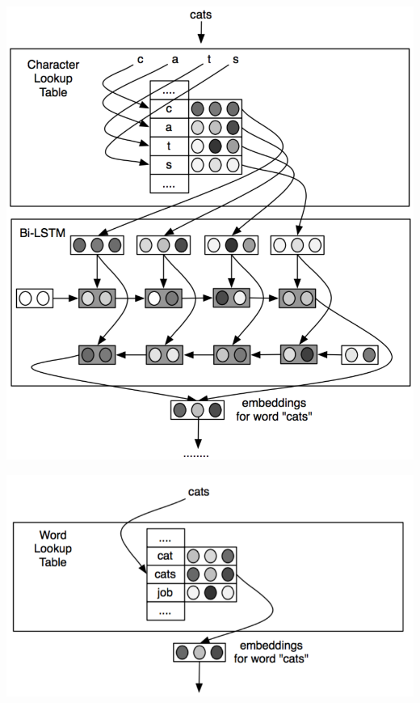 \documentclass[11pt, a4paper, landscape]{article}
\begin{document}
\begin{minipage}[b]{.5\linewidth}
    \includegraphics[width=\linewidth]{../article/img/bi-lstm-emeddings}\\
\end{minipage}
\begin{minipage}[b]{.5\linewidth}
    \includegraphics[width=\linewidth]{../article/img/word-lookup}
\end{minipage}
\vfill

\NewPage{}
\end{document}
